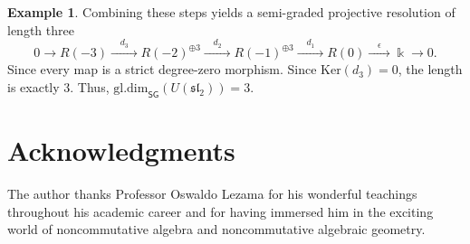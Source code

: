 \documentclass[reqno]{amsart}
\theoremstyle{definition}
\newtheorem{example}[theorem]{Example}
\theoremstyle{remark}
\numberwithin{equation}{section}
\begin{document}
\begin{example}
Combining these steps yields a semi-graded projective resolution of length three
\[
0 \longrightarrow R(-3) \xrightarrow{\quad d_3\quad } R(-2)^{\oplus 3} \xrightarrow{\quad d_2\quad } R(-1)^{\oplus 3} \xrightarrow{\quad d_1\quad } R(0) \xrightarrow{\quad \epsilon\quad } \Bbbk \longrightarrow 0.
\]
Since every map is a strict degree-zero morphism. Since $\mathrm{Ker}(d_3)=0$, the length is exactly $3$. Thus, $\mathrm{gl.dim}_{\mathsf{SG}}({U(\mathfrak{sl}_2)}) = 3$.
\end{example}





\section{Acknowledgments}

The author thanks Professor Oswaldo Lezama for his wonderful teachings throughout his academic career and for having immersed him in the exciting world of noncommutative algebra and noncommutative algebraic geometry.



\end{document}
